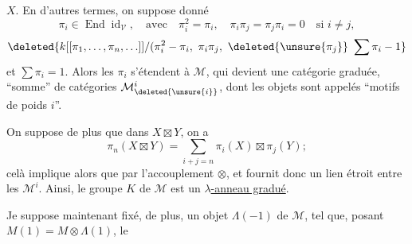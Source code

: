 $X$. En d'autres termes, on suppose donné 
\[
\pi_i\in\operatorname{End}\operatorname{id}_{\mathcal V},\quad\text{avec}\quad
\pi_i^2=\pi_i,\quad\pi_i\pi_j=\pi_j\pi_i=0\quad\text{si }i\ne j,
\]
\[
\deleted{k[[\pi_1,\ldots,\pi_n,\ldots]]/(\pi_i^2-\pi_i,\ \pi_i\pi_j,\ \deleted{\unsure{\pi_j}}\ \sum\pi_i-1}
\]
et $\sum\pi_i=1$. 
Alors les $\pi_i$ s'étendent à $\mathcal M$, qui devient une catégorie graduée,  ``somme'' de catégories $\mathcal M^{i}_{\deleted{\unsure{i}}}$, dont les objets sont appelés ``motifs de poids $i$''.

On suppose de plus que dans $X\boxtimes Y$, on a
\[
\pi_n(X\boxtimes Y)=\sum_{i+j=n}\pi_i(X)\boxtimes\pi_j(Y);
\]
celà implique alors que
par l'accouplement $\otimes$, et fournit donc un lien étroit entre les $\mathcal M^i$. Ainsi, le groupe $K$ de $\mathcal M$ est un \uline{$\lambda$-anneau gradué}.

 Je suppose maintenant fixé, de plus, un objet  $\Lambda(-1)$ de $\mathcal M$, tel que, posant \deleted{\unsure{\Lambda}} $M(1)=M\otimes\Lambda(1)$,  le
